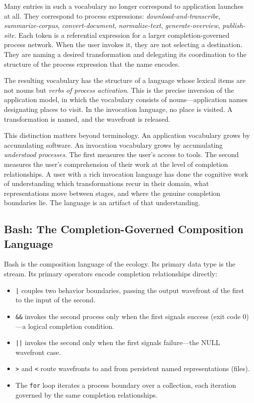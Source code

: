 \documentclass[12pt, a4paper]{article}
\begin{document}
Many entries in such a vocabulary no longer correspond to application
launches at all. They correspond to process expressions:
\textit{download-and-transcribe}, \textit{summarize-corpus},
\textit{convert-document}, \textit{normalize-text},
\textit{generate-overview}, \textit{publish-site}. Each token
is a referential expression for a larger completion-governed process
network. When the user invokes it, they are not selecting a
destination. They are naming a desired transformation and delegating
its coordination to the structure of the process expression that the
name encodes.

The resulting vocabulary has the structure of a language whose
lexical items are not nouns but \emph{verbs of process activation}.
This is the precise inversion of the application model, in which
the vocabulary consists of nouns---application names designating
places to visit. In the invocation language, no place is visited.
A transformation is named, and the wavefront is released.

This distinction matters beyond terminology. An application
vocabulary grows by accumulating software. An invocation vocabulary
grows by accumulating \emph{understood processes}. The first
measures the user's access to tools. The second measures the user's
comprehension of their work at the level of completion relationships.
A user with a rich invocation language has done the cognitive work
of understanding which transformations recur in their domain,
what representations move between stages, and where the genuine
completion boundaries lie. The language is an artifact of that
understanding.

\subsection{Bash: The Completion-Governed Composition Language}

Bash is the composition language of the ecology. Its primary data type
is the stream. Its primary operators encode completion relationships
directly:

\begin{itemize}
\item \texttt{|} couples two behavior boundaries, passing the output
  wavefront of the first to the input of the second.
\item \texttt{\&\&} invokes the second process only when the first
  signals success (exit code 0)---a logical completion condition.
\item \texttt{||} invokes the second only when the first signals
  failure---the NULL wavefront case.
\item \texttt{>} and \texttt{<} route wavefronts to and from
  persistent named representations (files).
\item The \texttt{for} loop iterates a process boundary over a
  collection, each iteration governed by the same completion
  relationships.
\end{itemize}
\end{document}
